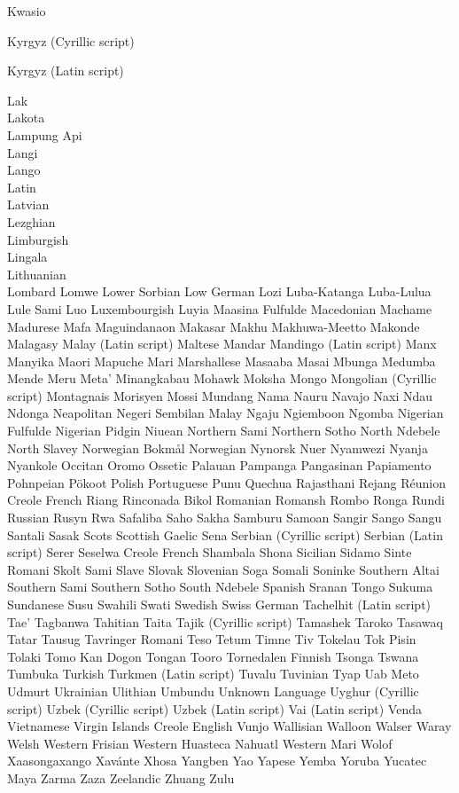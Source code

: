 \begin{multicols}{5}
Kwasio

Kyrgyz (Cyrillic script)

Kyrgyz (Latin script)

Lak\\
Lakota\\
Lampung Api\\
Langi\\
Lango\\
Latin\\
Latvian\\
Lezghian\\
Limburgish\\
Lingala\\
Lithuanian\\
Lombard
Lomwe
Lower Sorbian
Low German
Lozi
Luba-Katanga
Luba-Lulua
Lule Sami
Luo
Luxembourgish
Luyia
Maasina Fulfulde
Macedonian
Machame
Madurese
Mafa
Maguindanaon
Makasar
Makhu
Makhuwa-Meetto
Makonde
Malagasy
Malay (Latin script)
Maltese
Mandar
Mandingo (Latin script)
Manx
Manyika
Maori
Mapuche
Mari
Marshallese
Masaaba
Masai
Mbunga
Medumba
Mende
Meru
Meta’
Minangkabau
Mohawk
Moksha
Mongo
Mongolian (Cyrillic script)
Montagnais
Morisyen
Mossi
Mundang
Nama
Nauru
Navajo
Naxi
Ndau
Ndonga
Neapolitan
Negeri Sembilan Malay
Ngaju
Ngiemboon
Ngomba
Nigerian Fulfulde
Nigerian Pidgin
Niuean
Northern Sami
Northern Sotho
North Ndebele
North Slavey
Norwegian Bokmål
Norwegian Nynorsk
Nuer
Nyamwezi
Nyanja
Nyankole
Occitan
Oromo
Ossetic
Palauan
Pampanga
Pangasinan
Papiamento
Pohnpeian
Pökoot
Polish
Portuguese
Punu
Quechua
Rajasthani
Rejang
Réunion Creole French
Riang
Rinconada Bikol
Romanian
Romansh
Rombo
Ronga
Rundi
Russian
Rusyn
Rwa
Safaliba
Saho
Sakha
Samburu
Samoan
Sangir
Sango
Sangu
Santali
Sasak
Scots
Scottish Gaelic
Sena
Serbian (Cyrillic script)
Serbian (Latin script)
Serer
Seselwa Creole French
Shambala
Shona
Sicilian
Sidamo
Sinte Romani
Skolt Sami
Slave
Slovak
Slovenian
Soga
Somali
Soninke
Southern Altai
Southern Sami
Southern Sotho
South Ndebele
Spanish
Sranan Tongo
Sukuma
Sundanese
Susu
Swahili
Swati
Swedish
Swiss German
Tachelhit (Latin script)
Tae’
Tagbanwa
Tahitian
Taita
Tajik (Cyrillic script)
Tamashek
Taroko
Tasawaq
Tatar
Tausug
Tavringer Romani
Teso
Tetum
Timne
Tiv
Tokelau
Tok Pisin
Tolaki
Tomo Kan Dogon
Tongan
Tooro
Tornedalen Finnish
Tsonga
Tswana
Tumbuka
Turkish
Turkmen (Latin script)
Tuvalu
Tuvinian
Tyap
Uab Meto
Udmurt
Ukrainian
Ulithian
Umbundu
Unknown Language
Uyghur (Cyrillic script)
Uzbek (Cyrillic script)
Uzbek (Latin script)
Vai (Latin script)
Venda
Vietnamese
Virgin Islands Creole English
Vunjo
Wallisian
Walloon
Walser
Waray
Welsh
Western Frisian
Western Huasteca Nahuatl
Western Mari
Wolof
Xaasongaxango
Xavánte
Xhosa
Yangben
Yao
Yapese
Yemba
Yoruba
Yucatec Maya
Zarma
Zaza
Zeelandic
Zhuang
Zulu
\end{multicols}

